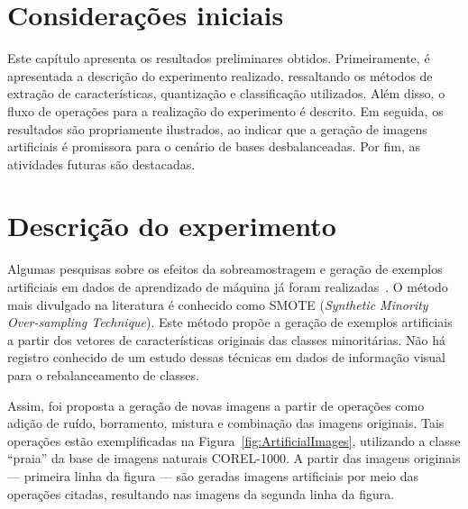 

\section{Considerações iniciais}

Este capítulo apresenta os resultados preliminares obtidos. Primeiramente, é apresentada a descrição do experimento realizado, ressaltando os métodos de extração de características, quantização e classificação utilizados. Além disso, o fluxo de operações para a realização do experimento é descrito. Em seguida, os resultados são propriamente ilustrados, ao indicar que a geração de imagens artificiais é promissora para o cenário de bases desbalanceadas. Por fim, as atividades futuras são destacadas.

\section{Descrição do experimento}

Algumas pesquisas sobre os efeitos da sobreamostragem e geração de exemplos artificiais em dados de aprendizado de máquina já foram realizadas~\cite{Kuncheva2004,Chawla2002}. O método mais divulgado na literatura é conhecido como SMOTE (\textit{Synthetic Minority Over-sampling Technique}). Este método propõe a geração de exemplos artificiais a partir dos vetores de características originais das classes minoritárias. Não há registro conhecido de um estudo dessas técnicas em dados de informação visual para o rebalanceamento de classes.


Assim, foi proposta a geração de novas imagens a partir de operações como adição de ruído, borramento, mistura e combinação das imagens originais. Tais operações estão exemplificadas na Figura~\ref{fig:ArtificialImages}, utilizando a classe ``praia'' da base de imagens naturais COREL-1000. A partir das imagens originais --- primeira linha da figura --- são geradas imagens artificiais por meio das operações citadas, resultando nas imagens da segunda linha da figura.

